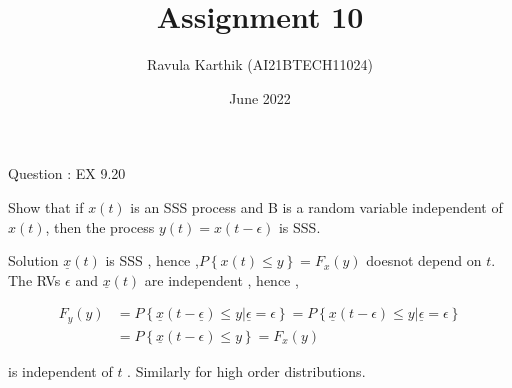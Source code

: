 \documentclass[journal,12pt,twocolumn]{beamer}
\title{Assignment 10}
\author{Ravula Karthik (AI21BTECH11024)}
\date {June 2022}
\providecommand{\brak}[1]{\ensuremath{\left(#1\right)}}
\providecommand{\cbrak}[1]{\ensuremath{\left\{#1\right\}}}
\begin{document}
	\begin{frame}
		\titlepage 
	\end{frame}
	
	\begin{frame}{Question : EX 9.20}
		
	Show that if $ x(t)$ is an SSS process and B is a random variable independent of $x(t)$, then the
	process $y(t) = x(t - \epsilon)$ is SSS.
	
	\end{frame}
	\begin{frame}{Solution}
		$\underline{x}(t)$ is SSS , hence ,$ P\cbrak{x(t) \leq y} = F_x\brak{y} $ doesnot depend on $t$. The RVs \underline{$\epsilon$} and $\underline{x}(t)$ are independent , hence ,
		
	\end{frame}
	
	\begin{frame}
	\begin{align}
		F_y(y) &= P\cbrak{\underline{x}(t - \underline{\epsilon}) \leq y | \underline{\epsilon} = \epsilon }
		=  P\cbrak{\underline{x}(t - \epsilon) \leq y | \underline{\epsilon} = \epsilon } \nonumber \\
		&= P\cbrak{\underline{x}(t - \epsilon) \leq y } = F_x(y) \nonumber
	\end{align} 
	
	is independent of $t$ . Similarly for high order distributions.
		
	\end{frame}
	
	
\end{document}
